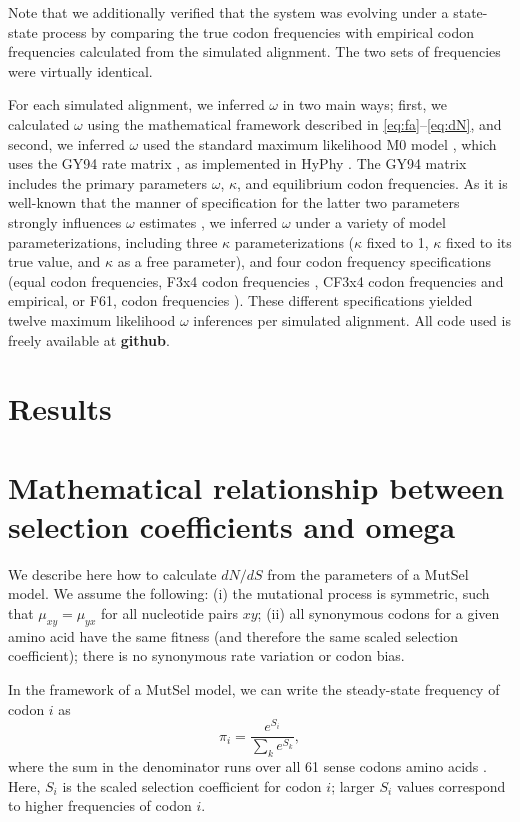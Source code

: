 \documentclass[11pt]{article}
\begin{document}
Note that we additionally verified that the system was evolving under a state-state process by comparing the true codon frequencies with empirical codon frequencies calculated from the simulated alignment. The two sets of frequencies were virtually identical.

For each simulated alignment, we inferred $\omega$ in two main ways; first, we calculated $\omega$ using the mathematical framework described in \eqref{eq:fa}--\eqref{eq:dN}, and second, we inferred $\omega$ used the standard maximum likelihood M0 model \cite{NielsenYang1998}, which uses the GY94 rate matrix \cite{GoldmanYang1994}, as implemented in HyPhy \cite{KosakovskyPondetal2005}. The GY94 matrix includes the primary parameters $\omega$, $\kappa$, and equilibrium codon frequencies. As it is well-known that the manner of specification for the latter two parameters strongly influences $\omega$ estimates \cite{YN00, Yang2006}, we inferred $\omega$ under a variety of model parameterizations, including three $\kappa$ parameterizations ($\kappa$ fixed to 1, $\kappa$ fixed to its true value, and $\kappa$ as a free parameter), and four codon frequency specifications (equal codon frequencies,  F3x4 codon frequencies \cite{MuseGaut1994}, CF3x4 codon frequencies \cite{Pond2010} and empirical, or F61, codon frequencies \cite{GoldmanYang1994}). These different specifications yielded twelve maximum likelihood $\omega$ inferences per simulated alignment. All code used is freely available at \textbf{github}.


\section*{Results}


\section*{Mathematical relationship between selection coefficients and omega}


We describe here how to calculate $dN/dS$ from the parameters of a MutSel model. We assume the following: (i) the mutational process is symmetric, such that $\mu_{xy}=\mu_{yx}$ for all nucleotide pairs $xy$; (ii) all synonymous codons for a given amino acid have the same fitness (and therefore the same scaled selection coefficient); there is no synonymous rate variation or codon bias.

In the framework of a MutSel model, we can write the steady-state frequency of codon $i$ as
\begin{equation}\label{eq:pi_a}
 \pi_i=\frac{e^{S_i}}{\sum_k e^{S_k}},
\end{equation}
where the sum in the denominator runs over all 61 sense codons amino acids \cite{SellaHirsh2005}. Here, $S_i$ is the scaled selection coefficient for codon $i$; larger $S_i$ values correspond to higher frequencies of codon $i$. 
\end{document}
